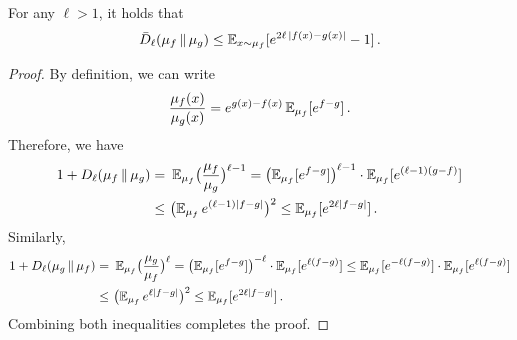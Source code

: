 \begin{lemma}\label{lem:Renyi-to-diff}
For any $\ell>1$, it holds that
\begin{align}
    \Dsys[\ell]{\mu_f}{\mu_g}
    \leq \En_{x\sim \mu_f}\brk{e^{2\ell\,\abs{f(x)-g(x)}}-1}\,.
\end{align}
\end{lemma}
\begin{proof}
By definition, we can write
\begin{align*}
    \frac{\mu_f(x)}{\mu_g(x)}=e^{g(x)-f(x)}\operatorname{\mathbb{E}}_{\mu_f}[e^{f-g}]\,.
\end{align*}
Therefore, we have
\begin{align*}
    1+\Dren[\ell]{\mu_f}{\mu_g}=&~\En_{\mu_f}\prn[\big]{\frac{\mu_f}{\mu_g}}^{\ell-1}
    = \prn*{\En_{\mu_f}[e^{f-g}]}^{\ell-1}\cdot \En_{\mu_f}[e^{(\ell-1)(g-f)}] \\
    \leq&~ \prn[\big]{\En_{\mu_f}e^{(\ell-1)\abs{f-g}}}^2
    \leq \En_{\mu_f}[e^{2\ell\abs{f-g}}]\,.
\end{align*}
Similarly,
\begin{align*}
    1+\Dren[\ell]{\mu_g}{\mu_f}=&~\En_{\mu_f}\prn[\big]{\frac{\mu_g}{\mu_f}}^{\ell}= \prn*{\En_{\mu_f}[e^{f-g}]}^{-\ell}\cdot \En_{\mu_f}[e^{\ell(f-g)}] 
    \leq \En_{\mu_f}[e^{-\ell(f-g)}]\cdot \En_{\mu_f}[e^{\ell(f-g)}]\\
    \leq&~ \prn[\big]{\En_{\mu_f}e^{\ell\abs{f-g}}}^2
    \leq \En_{\mu_f}[e^{2\ell\abs{f-g}}]\,.
\end{align*}
Combining both inequalities completes the proof.
\end{proof}















